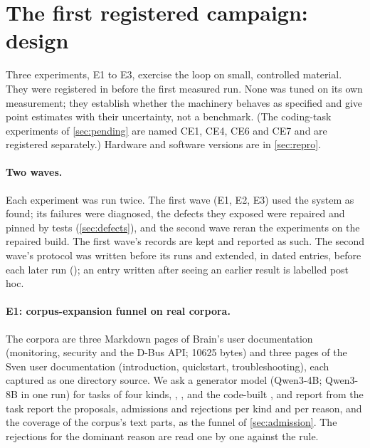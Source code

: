 
\section{The first registered campaign: design}\label{sec:design}

Three experiments, E1 to E3, exercise the loop on small, controlled material. They were
registered in  before the first measured run. None was tuned on its
own measurement; they establish whether the machinery behaves as specified and give point
estimates with their uncertainty, not a benchmark. (The coding-task experiments of
\cref{sec:pending} are named CE1, CE4, CE6 and CE7 and are registered separately.) Hardware
and software versions are in \cref{sec:repro}.

\paragraph{Two waves.} Each experiment was run twice. The first wave (E1, E2, E3) used the system as found; its failures were diagnosed, the defects they
exposed were repaired and pinned by tests (\cref{sec:defects}), and the second wave reran the
experiments on the repaired build. The first wave's records are kept and reported as such. The
second wave's protocol was written before its runs and extended, in dated entries, before each
later run (); an entry written after seeing an earlier result is
labelled post hoc.

\paragraph{E1: corpus-expansion funnel on real corpora.} The corpora are three Markdown pages
of Brain's user documentation (monitoring, security and the D-Bus API; 10625 bytes) and three
pages of the Sven user documentation (introduction, quickstart, troubleshooting), each captured as one directory
source. We ask a generator model (Qwen3-4B; Qwen3-8B in one run) for tasks of four kinds,
, ,  and the code-built , and report
from the task report the proposals, admissions and rejections per kind and per reason, and the
coverage of the corpus's text parts, as the funnel of \cref{sec:admission}. The rejections for
the dominant reason are read one by one against the rule.

